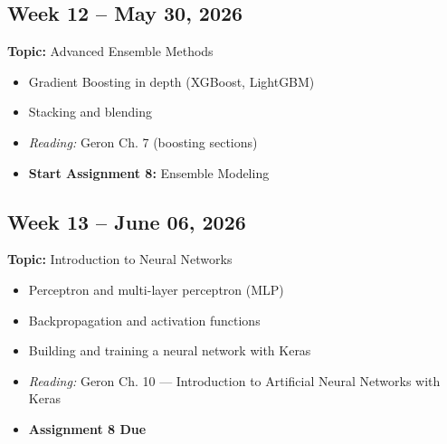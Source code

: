\documentclass[
  10pt,
]{article}
\providecommand{\tightlist}{%
  \setlength{\itemsep}{0pt}\setlength{\parskip}{0pt}}
\newenvironment{blackbox}{%
  \def\FrameCommand{%
    \hspace{1pt}%
    {\color{boxborder}\vrule width 2pt}%
    {\color{boxbg}\vrule width 4pt}%
    \colorbox{boxbg}%
  }%
  \MakeFramed{\advance\hsize-\width\FrameRestore}%
  \noindent\ignorespaces
}{%
  \endMakeFramed
}
\begin{document}
\begin{blackbox}

\begin{center}

\subsection{Week 12 -- May 30, 2026}\label{week-12-may-30-2026}

\end{center}

\textbf{Topic:} Advanced Ensemble Methods

\begin{itemize}
\tightlist
\item
  Gradient Boosting in depth (XGBoost, LightGBM)
\item
  Stacking and blending
\item
  \emph{Reading:} Geron Ch. 7 (boosting sections)
\item
  \textbf{Start Assignment 8:} Ensemble Modeling
\end{itemize}

\end{blackbox}

\begin{blackbox}

\begin{center}

\subsection{Week 13 -- June 06, 2026}\label{week-13-june-06-2026}

\end{center}

\textbf{Topic:} Introduction to Neural Networks

\begin{itemize}
\tightlist
\item
  Perceptron and multi-layer perceptron (MLP)
\item
  Backpropagation and activation functions
\item
  Building and training a neural network with Keras
\item
  \emph{Reading:} Geron Ch. 10 --- Introduction to Artificial Neural
  Networks with Keras
\item
  \textbf{Assignment 8 Due}
\end{itemize}

\end{blackbox}
\end{document}

